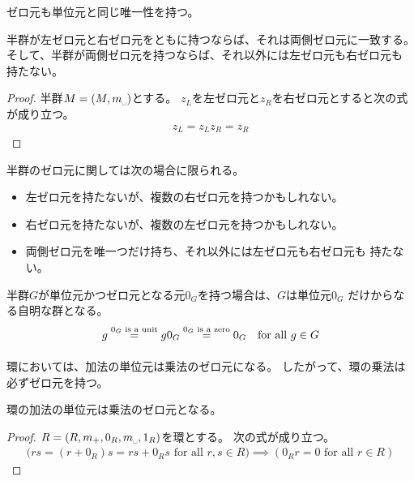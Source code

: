 	ゼロ元も単位元と同じ唯一性を持つ。

	\begin{proposition}[ゼロ元の唯一性]\label{prop:ゼロ元の唯一性} %
		半群が左ゼロ元と右ゼロ元をともに持つならば、それは両側ゼロ元に一致する。
		そして、半群が両側ゼロ元を持つならば、それ以外には左ゼロ元も右ゼロ元も
		持たない。
	\end{proposition} %
	\begin{proof} 半群$M=(M,m_\myspace)$とする。
	$z_L$を左ゼロ元と$z_R$を右ゼロ元とすると次の式が成り立つ。
	\begin{equation*}\begin{split}
		z_L = z_Lz_R = z_R
	\end{split}\end{equation*}
	\end{proof}

	半群のゼロ元に関しては次の場合に限られる。
	\begin{itemize}\setlength{\itemsep}{-1mm} %
		\item 左ゼロ元を持たないが、複数の右ゼロ元を持つかもしれない。
		\item 右ゼロ元を持たないが、複数の左ゼロ元を持つかもしれない。
		\item 両側ゼロ元を唯一つだけ持ち、それ以外には左ゼロ元も右ゼロ元も
		持たない。
	\end{itemize} %

	半群$G$が単位元かつゼロ元となる元$0_G$を持つ場合は、$G$は単位元$0_G$
	だけからなる自明な群となる。
	\begin{equation*}\begin{split}
		g \overset{\text{$0_G$ is a unit}}{\underset{}{=}} g0_G
		\overset{\text{$0_G$ is a zero}}{\underset{}{=}} 0_G
		\quad\text{for all }g\in G
	\end{split}\end{equation*}

	環においては、加法の単位元は乗法のゼロ元になる。
	したがって、環の乗法は必ずゼロ元を持つ。

	\begin{proposition}[環の乗法のゼロ元]\label{prop:環の乗法のゼロ元} %
		環の加法の単位元は乗法のゼロ元となる。
	\end{proposition} %
	\begin{proof} $R=(R,m_+,0_R,m_\myspace,1_R)$を環とする。
	次の式が成り立つ。
	\begin{equation*}\begin{split}
		\bigl(rs = (r + 0_R)s = rs + 0_Rs \text{ for all }r,s\in R\bigr)
		\implies (0_Rr = 0 \text{ for all }r\in R)
	\end{split}\end{equation*}
	\end{proof}
